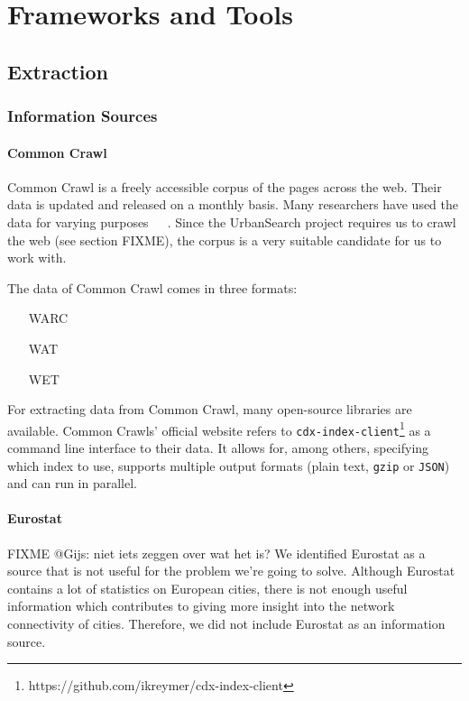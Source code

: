 \section{Frameworks and Tools}

\subsection{Extraction}
\subsubsection{Information Sources}

\paragraph{Common Crawl}
Common Crawl \cite{commoncrawl} is a freely accessible corpus of the pages across the web. Their data is updated and released on a monthly basis. Many researchers have used the data for varying purposes~\cite{smith2013dirt}~\cite{muhleisen2012web}~\cite{singh2012wikilinks}. Since the UrbanSearch project requires us to crawl the web (see section {\color{Red} FIXME}), the corpus is a very suitable candidate for us to work with.

The data of Common Crawl comes in three formats: 
\begin{itemize}
\item[WARC]
\item[WAT]
\item[WET]
\end{itemize}

For extracting data from Common Crawl, many open-source libraries are available. Common Crawls' official website refers to \texttt{cdx-index-client}\footnote{https://github.com/ikreymer/cdx-index-client} as a command line interface to their data. It allows for, among others, specifying which index to use, supports multiple output formats (plain text, \texttt{gzip} or \texttt{JSON}) and can run in parallel.

\paragraph{Eurostat}
{\color{Red} FIXME @Gijs: niet iets zeggen over wat het is?}
We identified Eurostat as a source that is not useful for the problem we're going to solve. Although Eurostat contains a lot of statistics on European cities, there is not enough useful information which contributes to giving more insight into the network connectivity of cities. Therefore, we did not include Eurostat as an information source.
